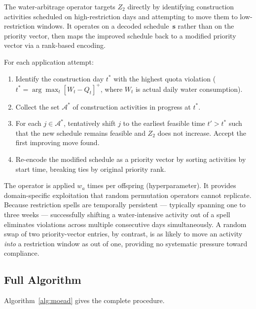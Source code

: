 \documentclass[12pt,a4paper]{article}
\newcommand{\Z}[1]{Z_{#1}}
\begin{document}
The water-arbitrage operator targets $\Z{2}$ directly by identifying construction
activities scheduled on high-restriction days and attempting to move them to
low-restriction windows.  It operates on a decoded schedule~$\mathbf{s}$ rather
than on the priority vector, then maps the improved schedule back to a modified
priority vector via a rank-based encoding.

For each application attempt:
\begin{enumerate}
  \item Identify the construction day $t^*$ with the highest quota violation
        ($t^* = \arg\max_t [W_t - Q_t]^+$, where $W_t$ is actual daily
        water consumption).
  \item Collect the set $\mathcal{A}^*$ of construction activities in progress at
        $t^*$.
  \item For each $j \in \mathcal{A}^*$, tentatively shift $j$ to the earliest
        feasible time $t' > t^*$ such that the new schedule remains feasible and
        $\Z{2}$ does not increase.  Accept the first improving move found.
  \item Re-encode the modified schedule as a priority vector by sorting activities
        by start time, breaking ties by original priority rank.
\end{enumerate}
The operator is applied $w_a$ times per offspring (hyperparameter).  It provides
domain-specific exploitation that random permutation operators cannot replicate.
Because restriction spells are temporally persistent --- typically spanning one to
three weeks --- successfully shifting a water-intensive activity out of a spell
eliminates violations across multiple consecutive days simultaneously.  A random
swap of two priority-vector entries, by contrast, is as likely to move an activity
\emph{into} a restriction window as out of one, providing no systematic pressure
toward compliance.

\subsection{Full Algorithm}
\label{sec:algo:full}

Algorithm~\ref{alg:moead} gives the complete procedure.
\end{document}
